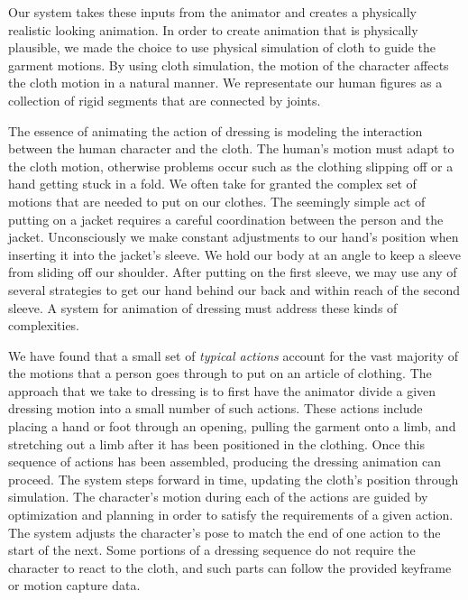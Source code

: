 Our system takes these inputs from the animator and creates a physically
realistic looking animation.  In order to create animation that is
physically plausible, we made the choice to use physical simulation of
cloth to guide the garment motions.  By using cloth simulation, the motion
of the character affects the cloth motion in a natural manner.  We
representate our human figures as a collection of rigid segments that are
connected by joints.


The essence of animating the action of dressing is modeling the
interaction between the human character and the cloth.  The human's motion
must adapt to the cloth motion, otherwise problems occur such as the
clothing slipping off or a hand getting stuck in a fold.  We often take
for granted the complex set of motions that are needed to put on our
clothes.  The seemingly simple act of putting on a jacket requires a
careful coordination between the person and the jacket.  Unconsciously we
make constant adjustments to our hand’s position when inserting it into
the jacket’s sleeve.  We hold our body at an angle to keep a sleeve from
sliding off our shoulder.  After putting on the first sleeve, we may use
any of several strategies to get our hand behind our back and within reach
of the second sleeve.  A system for animation of dressing must address
these kinds of complexities.

We have found that a small set of \emph{typical actions} account for the vast
majority of the motions that a person goes through to put on an article of
clothing.  The approach that we take to dressing is to first have the
animator divide a given dressing motion into a small number of such
actions.  These actions include placing a hand or foot through an opening,
pulling the garment onto a limb, and stretching out a limb after it has
been positioned in the clothing.  Once this sequence of actions has been
assembled, producing the dressing animation can proceed.  The system steps
forward in time, updating the cloth's position through simulation.  The
character's motion during each of the actions are guided by optimization
and planning in order to satisfy the requirements of a given
action.  The system adjusts the character's pose to match the end of one
action to the start of the next.  Some portions of a dressing sequence do
not require the character to react to the cloth, and such parts can follow
the provided keyframe or motion capture data.

